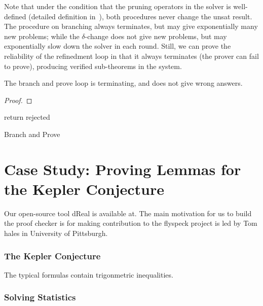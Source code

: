 \documentclass[envcountsect]{llncs}
\begin{document}
\begin{example}
 
\end{example}

Note that under the condition that the pruning operators in the solver is
well-defined (detailed definition in~\cite{}), both procedures never change the
unsat result. The procedure on branching always terminates, but may give
exponentially many new problems; while the $\delta$-change does not give new
problems, but may exponentially slow down the solver in each round. Still, we
can prove the reliability of the refinedment loop in that it always terminates
(the prover can fail to prove), producing verified sub-theorems in the system. 
\begin{proposition}
The branch and prove loop is terminating, and does not give wrong answers. 
\end{proposition}
\begin{proof}
\end{proof}

\begin{algorithm}
\BlankLine
{}
return {\sf rejected}\;
\caption{Branch and Prove\label{algo1}}
\end{algorithm}



\section{Case Study: Proving Lemmas for the Kepler Conjecture}\label{kepler}

Our open-source tool dReal is available at. The main motivation for us to build
the proof checker is for making contribution to the flyspeck project is led
by Tom hales in University of Pittsburgh. 

\subsubsection{The Kepler Conjecture}

The typical formulas contain trigonmetric inequalities.

\subsubsection{Solving Statistics}
\end{document}
